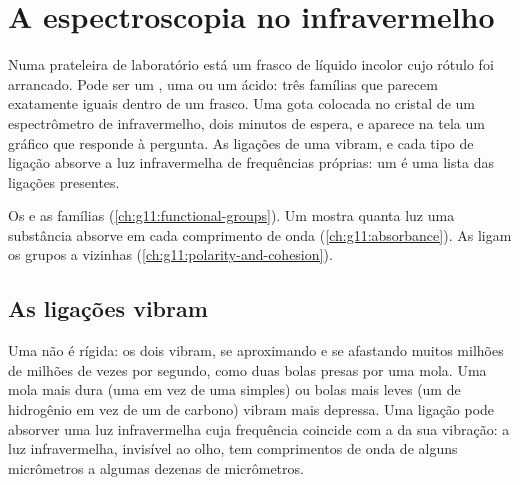 \chapter{A espectroscopia no infravermelho}\label{ch:g11:infrared}

Numa prateleira de laboratório está um frasco de líquido incolor cujo
rótulo foi arrancado. Pode ser um , uma  ou um ácido: três
famílias que parecem exatamente iguais dentro de um frasco. Uma gota
colocada no cristal de um espectrômetro de infravermelho, dois minutos
de espera, e aparece na tela um gráfico que responde à pergunta. As
ligações de uma  vibram, e cada tipo de ligação absorve a luz
infravermelha de frequências próprias: um  é uma
lista das ligações presentes.

\begin{recall}
Os  e as famílias (\cref{ch:g11:functional-groups}).
Um  mostra quanta luz uma substância absorve em cada
comprimento de onda (\cref{ch:g11:absorbance}). As  ligam os grupos  a  vizinhas
(\cref{ch:g11:polarity-and-cohesion}).
\end{recall}

\section{As ligações vibram}

Uma  não é rígida: os dois  vibram, se aproximando
e se afastando muitos milhões de milhões de vezes por segundo, como duas
bolas presas por uma mola. Uma mola mais dura (uma  em vez
de uma simples) ou bolas mais leves (um  de hidrogênio em vez de um
 de carbono) vibram mais depressa. Uma ligação pode absorver uma
luz infravermelha cuja frequência coincide com a da sua vibração: a luz
infravermelha, invisível ao olho, tem comprimentos de onda de alguns
micrômetros a algumas dezenas de micrômetros.

